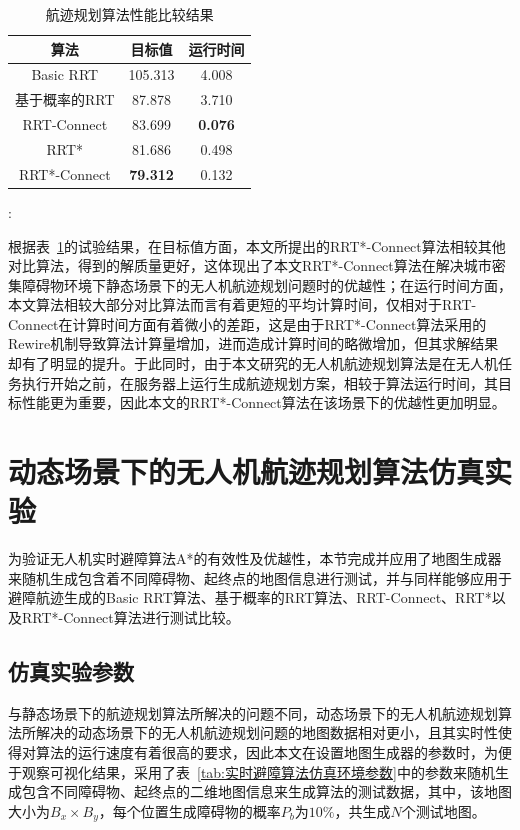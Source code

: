 \begin{table}[!htbp]
    \caption{航迹规划算法性能比较结果}
    \label{tab:航迹规划算法性能比较结果}
    \centering
    \begin{tabular}{c c c}
        \toprule
        \textbf{算法} & \textbf{目标值} & \textbf{运行时间} \\
        \midrule
        Basic RRT & 105.313 & 4.008  \\
        基于概率的RRT & 87.878 & 3.710  \\
        RRT-Connect & 83.699 & \textbf{0.076} \\
        RRT* & 81.686 & 0.498 \\
        RRT*-Connect & \textbf{79.312} & 0.132 \\
        \bottomrule
    \end{tabular}:
\end{table}

根据表~\ref{tab:航迹规划算法性能比较结果}的试验结果，在目标值方面，本文所提出的RRT*-Connect算法相较其他对比算法，得到的解质量更好，这体现出了本文RRT*-Connect算法在解决城市密集障碍物环境下静态场景下的无人机航迹规划问题时的优越性；在运行时间方面，本文算法相较大部分对比算法而言有着更短的平均计算时间，仅相对于RRT-Connect在计算时间方面有着微小的差距，这是由于RRT*-Connect算法采用的Rewire机制导致算法计算量增加，进而造成计算时间的略微增加，但其求解结果却有了明显的提升。于此同时，由于本文研究的无人机航迹规划算法是在无人机任务执行开始之前，在服务器上运行生成航迹规划方案，相较于算法运行时间，其目标性能更为重要，因此本文的RRT*-Connect算法在该场景下的优越性更加明显。

\section{动态场景下的无人机航迹规划算法仿真实验}

为验证无人机实时避障算法A*的有效性及优越性，本节完成并应用了地图生成器来随机生成包含着不同障碍物、起终点的地图信息进行测试，并与同样能够应用于避障航迹生成的Basic RRT算法、基于概率的RRT算法、RRT-Connect、RRT*以及RRT*-Connect算法进行测试比较。

\subsection{仿真实验参数}

与静态场景下的航迹规划算法所解决的问题不同，动态场景下的无人机航迹规划算法所解决的动态场景下的无人机航迹规划问题的地图数据相对更小，且其实时性使得对算法的运行速度有着很高的要求，因此本文在设置地图生成器的参数时，为便于观察可视化结果，采用了表~\ref{tab:实时避障算法仿真环境参数}中的参数来随机生成包含不同障碍物、起终点的二维地图信息来生成算法的测试数据，其中，该地图大小为\( B_x \times B_y \)，每个位置生成障碍物的概率\( P_b \)为\(10\%\)，共生成\( N \)个测试地图。

